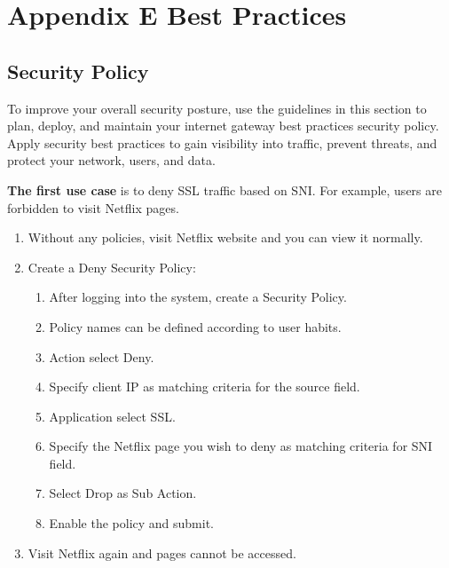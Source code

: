 %
\chapter*{\hypertarget{link:Appendix E Best Practices}{Appendix E Best Practices}}
\label{sec:appendix_f}

\section*{\hypertarget{link:Appendix Security Policy}{Security Policy}}
\label{sec:appendix_f:policy}

To improve your overall security posture, use the guidelines in this section to plan, deploy, and maintain your internet gateway best practices security policy. Apply security best practices to gain visibility into traffic, prevent threats, and protect your network, users, and data. 


\textbf{The first use case} is to deny SSL traffic based on SNI. For example, users are forbidden to visit Netflix pages.

\begin{description}[leftmargin=0pt,itemindent=0em]
    \item[] 
    \begin{enumerate}
        \item Without any policies, visit Netflix website and you can view it normally.
        \item	Create a Deny Security Policy:
        \begin{enumerate}
            \item 	After logging into the system, create a Security Policy.
            \item	Policy names can be defined according to user habits.
            \item	Action select Deny.
            \item	Specify client IP as matching criteria for the source field. 
            \item	Application select SSL.
            \item	Specify the Netflix page you wish to deny as matching criteria for SNI field.  
            \item	Select Drop as Sub Action.
            \item	Enable the policy and submit.
        \end{enumerate}
        \item	Visit Netflix again and pages cannot be accessed.
    \end{enumerate}	
\end{description}

